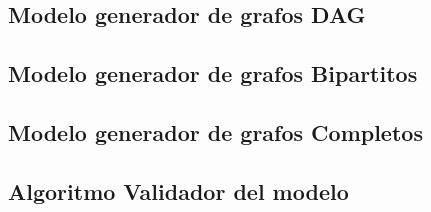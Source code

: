 \subsection{Modelo generador de grafos DAG}
\subsection{Modelo generador de grafos Bipartitos}
\subsection{Modelo generador de grafos Completos}
\subsection{Algoritmo Validador del modelo}